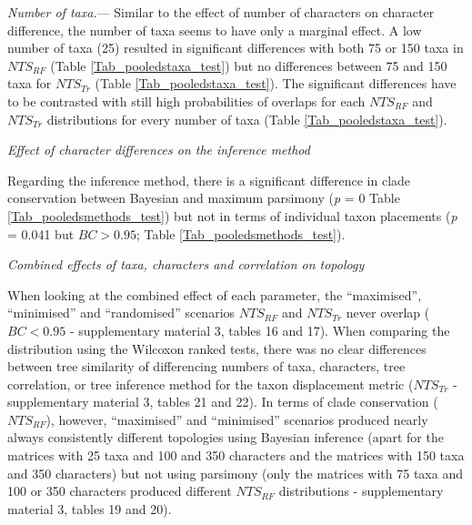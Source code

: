 \documentclass[12pt,letterpaper]{article}
\renewcommand{\subsection}[1]{%
\bigskip
\begin{center}
\begin{large}
\normalfont\itshape #1
\end{large}
\end{center}}
\renewcommand{\subsubsection}[1]{%
\vspace{2ex}
\noindent
\textit{#1.}---}
\begin{document}


\subsubsection{Number of taxa}
Similar to the effect of number of characters on character difference, the number of taxa seems to have only a marginal effect.
A low number of taxa (25) resulted in significant differences with both 75 or 150 taxa in $NTS_{RF}$ (Table \ref{Tab_pooledstaxa_test}) but no differences between 75 and 150 taxa for $NTS_{Tr}$ (Table \ref{Tab_pooledstaxa_test}).
The significant differences have to be contrasted with still high probabilities of overlaps for each $NTS_{RF}$ and $NTS_{Tr}$ distributions for every number of taxa (Table \ref{Tab_pooledstaxa_test}).



\subsection{Effect of character differences on the inference method}
Regarding the inference method, there is a significant difference in clade conservation between Bayesian and maximum parsimony (\textit{p} = 0 Table \ref{Tab_pooledsmethods_test}) but not in terms of individual taxon placements (\textit{p} = 0.041 but $BC > 0.95$; Table \ref{Tab_pooledsmethods_test}).




\subsection{Combined effects of taxa, characters and correlation on topology}
When looking at the combined effect of each parameter, the ``maximised'', ``minimised'' and ``randomised'' scenarios $NTS_{RF}$ and $NTS_{Tr}$ never overlap ($BC < 0.95$ - supplementary material 3, tables 16 and 17).
When comparing the distribution using the Wilcoxon ranked tests, there was no clear differences between tree similarity of differencing numbers of taxa, characters, tree correlation, or tree inference method for the taxon displacement metric ($NTS_{Tr}$ - supplementary material 3, tables 21 and 22).
In terms of clade conservation ($NTS_{RF}$), however, ``maximised'' and ``minimised'' scenarios produced nearly always consistently different topologies using Bayesian inference (apart for the matrices with 25 taxa and 100 and 350 characters and the matrices with 150 taxa and 350 characters) but not using parsimony (only the matrices with 75 taxa and 100 or 350 characters produced different $NTS_{RF}$ distributions - supplementary material 3, tables 19 and 20).
\end{document}
